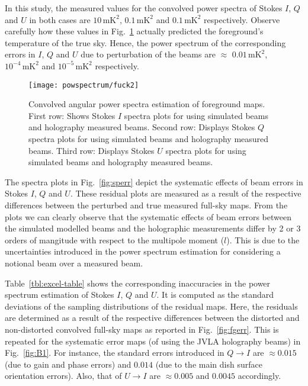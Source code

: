In this study, the measured values for the convolved power spectra of Stokes $I$, $Q$ and $U$ in both cases are $10\, \mathrm{mK^2}$, $0.1\, \mathrm{mK^2}$ 
and $0.1\, \mathrm{mK^2}$ respectively. Observe carefully how these values in Fig.~\ref{fig:fg15} actually predicted the foreground's temperature of the true sky.
Hence, the power spectrum of the corresponding errors in $I$, $Q$ and $U$ due to perturbation of the beams are $\approx$ $0.01\, \mathrm{mK^2}$, $10^{-4}\, \mathrm{mK^2}$ 
and $10^{-5}\, \mathrm{mK^2}$ respectively.
  \begin{figure}
      \centering      
      \texttt{[image: powspectrum/fuck2]}    
     \caption{Convolved angular power spectra  estimation of foreground maps. First row: Shows Stokes $I$ spectra plots for using simulated beams and holography measured beams. Second row: Displays Stokes $Q$ spectra plots for using simulated beams and holography measured beams. 
         Third row: Displays Stokes $U$ spectra plots for using simulated beams and holography measured beams.
          }\label{fig:fg15}   
    \end{figure}
    \FloatBarrier
 

% 
The spectra plots in Fig.~\ref{fig:sperr} depict the systematic effects of beam errors in Stokes $I$, $Q$ and $U$. These residual plots are measured as a result of the respective differences between the perturbed and true  measured full-sky maps. From the plots we can clearly observe that the systematic effects of beam errors between the simulated modelled beams and the holographic measurements   differ by 2 or 3 orders of mangitude with respect to the multipole moment ($l$). This is due to the uncertainties introduced in the power spectrum estimation for considering a notional beam over a measured beam.

Table~\ref{tbl:excel-table} shows the corresponding inaccuracies in the power spectrum estimation of Stokes $I$, $Q$ and $U$. It is computed as the standard deviations of the sampling distributions of the residual maps. Here, the residuals are determined as a result of the respective differences between the distorted and non-distorted convolved full-sky maps as reported in Fig.~\ref{fig:fgerr}. This is repeated for the systematic error maps (of using the JVLA holography beams) in Fig.~\ref{fig:B1}. For instance, the standard errors introduced in $Q \longrightarrow I$ are $\approx 0.015$ (due to gain and phase errors) and $0.014$ (due to the main dish surface orientation errors). Also, that of $U \longrightarrow I$ are $\approx 0.005$  and $0.0045$ accordingly. 


